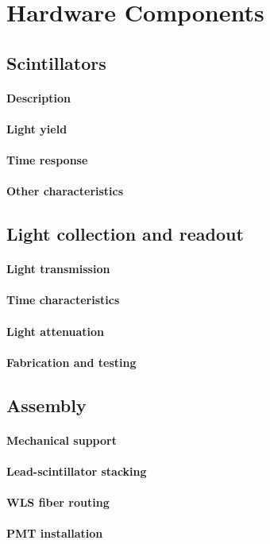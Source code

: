 \section{Hardware Components}

\subsection{Scintillators}
\paragraph{Description}
\paragraph{Light yield}
\paragraph{Time response}
\paragraph{Other characteristics}

\subsection{Light collection and readout}
\paragraph{Light transmission}
\paragraph{Time characteristics}
\paragraph{Light attenuation}
\paragraph{Fabrication and testing}

\subsection{Assembly}
\paragraph{Mechanical support}
\paragraph{Lead-scintillator stacking}
\paragraph{WLS fiber routing}
\paragraph{PMT installation}








